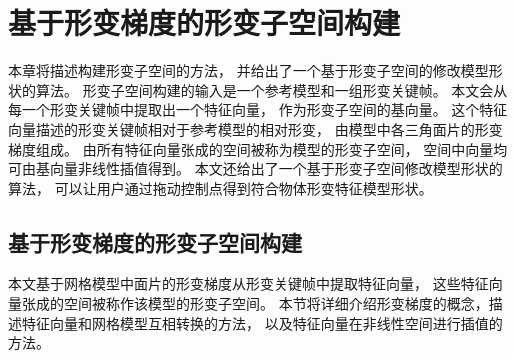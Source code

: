 \chapter{基于形变梯度的形变子空间构建}
本章将描述构建形变子空间的方法，
并给出了一个基于形变子空间的修改模型形状的算法。
形变子空间构建的输入是一个参考模型和一组形变关键帧。
本文会从每一个形变关键帧中提取出一个特征向量，
作为形变子空间的基向量。
这个特征向量描述的形变关键帧相对于参考模型的相对形变，
由模型中各三角面片的形变梯度组成。
由所有特征向量张成的空间被称为模型的形变子空间，
空间中向量均可由基向量非线性插值得到。
本文还给出了一个基于形变子空间修改模型形状的算法，
可以让用户通过拖动控制点得到符合物体形变特征模型形状。
\section{基于形变梯度的形变子空间构建}
本文基于网格模型中面片的形变梯度从形变关键帧中提取特征向量，
这些特征向量张成的空间被称作该模型的形变子空间。
本节将详细介绍形变梯度的概念，描述特征向量和网格模型互相转换的方法，
以及特征向量在非线性空间进行插值的方法。
